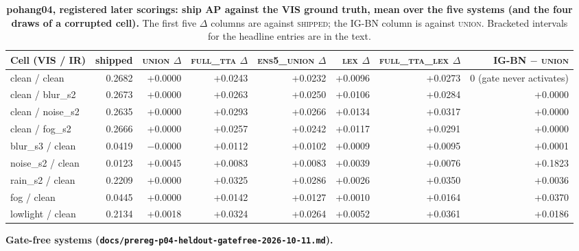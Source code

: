 \documentclass[10pt]{article}
\begin{document}
\begin{table}[htbp]
\centering
\footnotesize
\caption{\textbf{pohang04, registered later scorings: ship AP against the VIS ground truth, mean over the five systems (and the four draws of a corrupted cell).} The first five $\Delta$ columns are against \textsc{shipped}; the IG-BN column is against \textsc{union}. Bracketed intervals for the headline entries are in the text.}
\label{tab:17}
\setlength{\tabcolsep}{3pt}
\begin{adjustbox}{max width=\linewidth}
\begin{tabular}{lrrrrrrr}
\toprule
Cell (VIS / IR) & shipped & \textsc{union} $\Delta$ & \textsc{full\_tta} $\Delta$ & \textsc{ens5\_union} $\Delta$ & \textsc{lex} $\Delta$ & \textsc{full\_tta\_lex} $\Delta$ & IG-BN $-$ \textsc{union} \\
\midrule
clean / clean & 0.2682 & +0.0000 & +0.0243 & +0.0232 & +0.0096 & +0.0273 & 0 (gate never activates) \\
clean / blur\_s2 & 0.2673 & +0.0000 & +0.0263 & +0.0250 & +0.0106 & +0.0284 & +0.0000 \\
clean / noise\_s2 & 0.2635 & +0.0000 & +0.0293 & +0.0266 & +0.0134 & +0.0317 & +0.0000 \\
clean / fog\_s2 & 0.2666 & +0.0000 & +0.0257 & +0.0242 & +0.0117 & +0.0291 & +0.0000 \\
blur\_s3 / clean & 0.0419 & $-$0.0000 & +0.0112 & +0.0102 & +0.0009 & +0.0095 & +0.0001 \\
noise\_s2 / clean & 0.0123 & +0.0045 & +0.0083 & +0.0083 & +0.0039 & +0.0076 & +0.1823 \\
rain\_s2 / clean & 0.2209 & +0.0000 & +0.0325 & +0.0286 & +0.0026 & +0.0350 & +0.0036 \\
fog / clean & 0.0445 & +0.0000 & +0.0142 & +0.0127 & +0.0010 & +0.0164 & +0.0370 \\
lowlight / clean & 0.2134 & +0.0018 & +0.0324 & +0.0264 & +0.0052 & +0.0361 & +0.0186 \\
\bottomrule
\end{tabular}
\end{adjustbox}
\end{table}
\textbf{Gate-free systems (\texttt{docs/\allowbreak{}prereg-p04-heldout-gatefree-2026-10-11.md}).}
\end{document}
